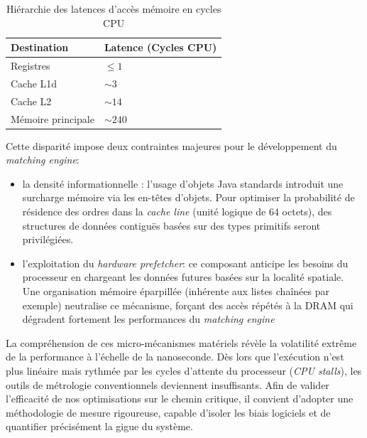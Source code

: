 \begin{table}[H]
    \centering
    \begin{tabular}{@{}ll@{}}
        \toprule
        \textbf{Destination} & \textbf{Latence (Cycles CPU)} \\ 
        \midrule
        Registres            & $\le 1$                      \\
        Cache L1d            & $\sim 3$                     \\
        Cache L2             & $\sim 14$                    \\
        Mémoire principale   & $\sim 240$                   \\ 
        \bottomrule
    \end{tabular}
    \caption{Hiérarchie des latences d'accès mémoire en cycles CPU}
    \label{tab:latency_cycles}
\end{table}

Cette disparité impose deux contraintes majeures pour le développement du \textit{matching engine}:

\begin{itemize}
    \item la densité informationnelle : l'usage d'objets Java standards introduit une surcharge mémoire via les en-têtes d'objets. Pour optimiser la probabilité de résidence des ordres dans la \textit{cache line} (unité logique de 64 octets), des structures de données contiguës basées sur des types primitifs seront privilégiées.
    \item  l'exploitation du \textit{hardware prefetcher}: ce composant anticipe les besoins du processeur en chargeant les données futures basées sur la localité spatiale. Une organisation mémoire éparpillée (inhérente aux listes chaînées par exemple) neutralise ce mécanisme, forçant des accès répétés à la DRAM qui dégradent fortement les performances du \textit{matching engine}
\end{itemize}

La compréhension de ces micro-mécanismes matériels révèle la volatilité extrême de la performance à l'échelle de la nanoseconde. Dès lors que l'exécution n'est plus linéaire mais rythmée par les cycles d'attente du processeur (\textit{CPU stalls}), les outils de métrologie conventionnels deviennent insuffisants. Afin de valider l'efficacité de nos optimisations sur le chemin critique, il convient d'adopter une méthodologie de mesure rigoureuse, capable d'isoler les biais logiciels et de quantifier précisément la gigue du système.

